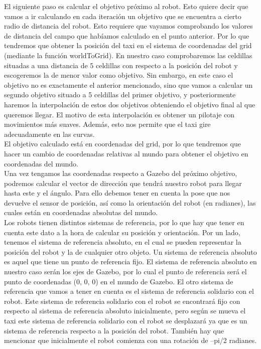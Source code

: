 El siguiente paso es calcular el objetivo próximo al robot. Esto quiere decir que vamos a ir calculando en cada iteración un objetivo que se encuentra a cierto radio de distancia del robot. Esto requiere que vayamos comprobando los valores de distancia del campo que habíamos calculado en el punto anterior. Por lo que tendremos que obtener la posición del taxi en el sistema de coordenadas del grid (mediante la función worldToGrid). En nuestro caso comprobaremos las celdillas situadas a una distancia de 5 celdillas con respecto a la posición del robot y escogeremos la de menor valor como objetivo. Sin embargo, en este caso el objetivo no es exactamente el anterior mencionado, sino que vamos a calcular un segundo objetivo situado a 5 celdillas del primer objetivo, y posteriormente haremos la interpolación de estos dos objetivos obteniendo el objetivo final al que queremos llegar. El motivo de esta interpolación es obtener un pilotaje con movimientos más suaves. Además, esto nos permite que el taxi gire adecuadamente en las curvas. \\

El objetivo calculado está en coordenadas del grid, por lo que tendremos que hacer un cambio de coordenadas relativas al mundo para obtener el objetivo en coordenadas del mundo.\\

Una vez tengamos las coordenadas respecto a Gazebo del próximo objetivo, podremos calcular el vector de dirección que tendrá nuestro robot para llegar hasta este y el ángulo. Para ello debemos tener en cuenta la pose que nos devuelve el sensor de posición, así como la orientación del robot (en radianes), las cuales están en coordenadas absolutas del mundo.\\

Los robots tienen distintos sistemas de referencia, por lo que hay que tener en cuenta este dato a la hora de calcular su posición y orientación. Por un lado, tenemos el sistema de referencia absoluto, en el cual se pueden representar la posición del robot y la de cualquier otro objeto. Un sistema de referencia absoluto es aquel que tiene un punto de referencia fijo. El sistema de referencia absoluto en nuestro caso serán los ejes de Gazebo, por lo cual el punto de referencia será el punto de coordenadas (0, 0, 0) en el mundo de Gazebo. El otro sistema de referencia que vamos a tener en cuenta es el sistema de referencia solidario con el robot. Este sistema de referencia solidario con el robot se encontrará fijo con respecto al sistema de referencia absoluto inicialmente, pero según se mueva el taxi este sistema de referencia solidario con el robot se desplazará ya que es un sistema de referencia respecto a la posición del robot. También hay que mencionar que inicialmente el robot comienza con una rotación de –pi/2 radianes.\\

